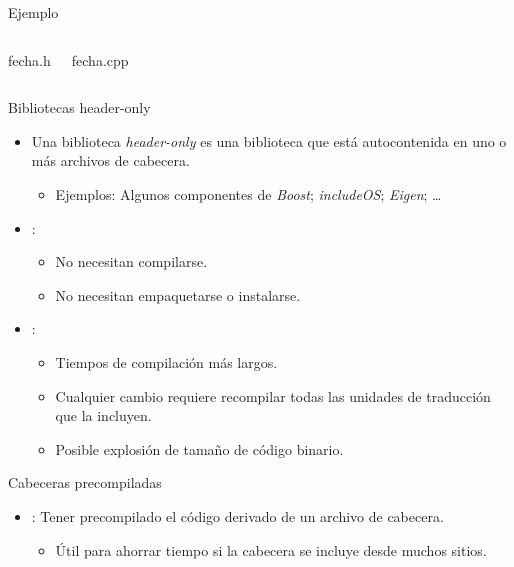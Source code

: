 \begin{frame}[t]{Ejemplo}
\begin{columns}

\begin{block}{fecha.h}

\end{block}

\begin{block}{fecha.cpp}

\end{block}

\end{columns}
\end{frame}

\begin{frame}{Bibliotecas header-only}
\begin{itemize}
  \item Una biblioteca \emph{header-only} es una biblioteca que está autocontenida en uno o más
        archivos de cabecera.
    \begin{itemize}
      \item Ejemplos: Algunos componentes de \emph{Boost}; \emph{includeOS}; \emph{Eigen}; \ldots
    \end{itemize}

  \vfill
  \item {}:
    \begin{itemize}
      \item No necesitan compilarse.
      \item No necesitan empaquetarse o instalarse.
    \end{itemize}

  \vfill
  \item {}:
    \begin{itemize}
      \item Tiempos de compilación más largos.
      \item Cualquier cambio requiere recompilar todas las unidades de traducción que la incluyen.
      \item Posible explosión de tamaño de código binario.
    \end{itemize}
\end{itemize}
\end{frame}

\begin{frame}[t]{Cabeceras precompiladas}
\begin{itemize}
  \item {}: Tener precompilado el código derivado de un archivo de cabecera.
    \begin{itemize}
      \item Útil para ahorrar tiempo si la cabecera se incluye desde muchos sitios.
    \end{itemize}
\end{itemize}
\end{frame}


